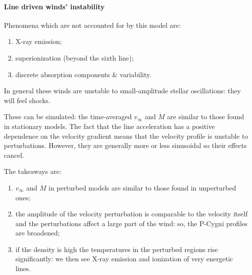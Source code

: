 \documentclass[main.tex]{subfiles}
\begin{document}
\paragraph{Line driven winds' instability}

Phenomena which are not accounted for by this model are: 
\begin{enumerate}
    \item X-ray emission;
    \item superionization (beyond the sixth line);
    \item discrete absorption components \& variability.
\end{enumerate}

In general these winds are unstable to small-amplitude stellar oscillations: they will feel shocks.

These can be simulated: the time-averaged \(v_{ \infty }\) and \(\dot{M}\) are similar to those found in stationary models. 
The fact that the line acceleration has a positive dependence on the velocity gradient means that the velocity profile is unstable to perturbations. However, they are generally more or less sinusoidal so their effects cancel.

The takeaways are: 
\begin{enumerate}
  \item \(v_{ \infty }\) and \(\dot{M}\) in perturbed models are similar to those found in unperturbed ones;
  \item the amplitude of the velocity perturbation is comparable to the velocity itself and the perturbations affect a large part of the wind: so, the P-Cygni profiles are broadened;
  \item if the density is high the temperatures in the perturbed regions rise significantly: we then see X-ray emission and ionization of very energetic lines.
\end{enumerate}
\end{document}
